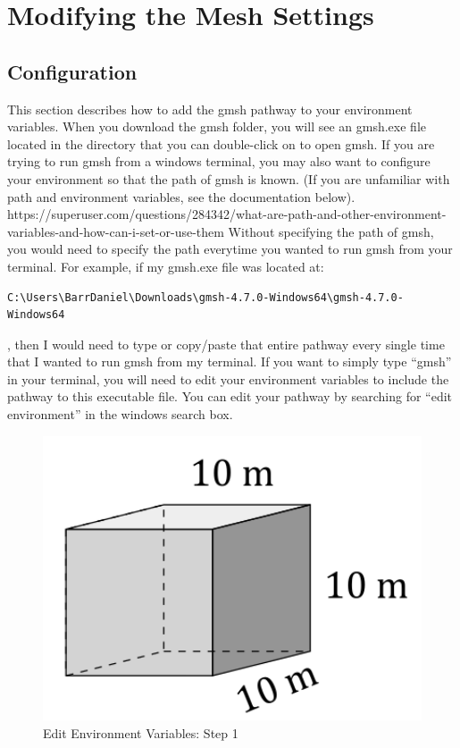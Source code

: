\documentclass{report}
\begin{document}
\chapter{Modifying the Mesh Settings}
\section{Configuration}
This section describes how to add the gmsh pathway to your environment variables. \newline \newline
When you download the gmsh folder, you will see an gmsh.exe file located in the directory that you can double-click on to open gmsh. If you are trying to run gmsh from a windows terminal, you may also want to configure your environment so that the path of gmsh is known. (If you are unfamiliar with path and environment variables, see the documentation below). \newline \newline
https://superuser.com/questions/284342/what-are-path-and-other-environment-variables-and-how-can-i-set-or-use-them \newline \newline
Without specifying the path of gmsh, you would need to specify the path everytime you wanted to run gmsh from your terminal. For example, if my gmsh.exe file was located at: \begin{verbatim}
C:\Users\BarrDaniel\Downloads\gmsh-4.7.0-Windows64\gmsh-4.7.0-Windows64 \end{verbatim}  
, then I would need to type or copy/paste that entire pathway every single time that I wanted to run gmsh from my terminal. If you want to simply type ``gmsh'' in your terminal, you will need to edit your environment variables to include the pathway to this executable file. You can edit your pathway by searching for ``edit environment'' in the windows search box. \newline
\begin{figure}[h]
  \centering
  \includegraphics[width=15cm]{cube_tech_ill.png}
  \setcaptionwidth{15cm}
  \caption{Edit Environment Variables: Step 1}
  \label{TSDA_connected_bodies}
\end{figure}
\end{document}
